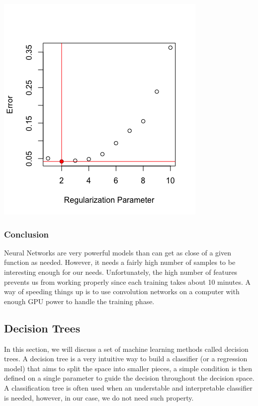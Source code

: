 \documentclass[]{report}
\begin{document}
 \begin{center}
 	\includegraphics[width=0.6\linewidth]{Figures/nnet_fda_reg_cv.png}
 	\label{fig:nnet_fda_reg_cv}
 \end{center}

\subsubsection{Conclusion}
Neural Networks are very powerful models than can get as close of a given function as needed. However, it needs a fairly high number of samples to be interesting enough for our needs. Unfortunately, the high number of features prevents us from working properly since each training takes about 10 minutes. A way of speeding things up is to use convolution networks on a computer with enough GPU power to handle the training phase.

\pagebreak

\subsection{Decision Trees}
 In this section, we will discuss a set of machine learning methods called decision trees. A decision tree is a very intuitive way to build a classifier (or a regression model) that aims to split the space into smaller pieces, a simple condition is then defined on a single parameter to guide the decision throughout the decision space. A classification tree is often used when an understable and interpretable classifier is needed, however, in our case, we do not need such property.
 
\end{document}
